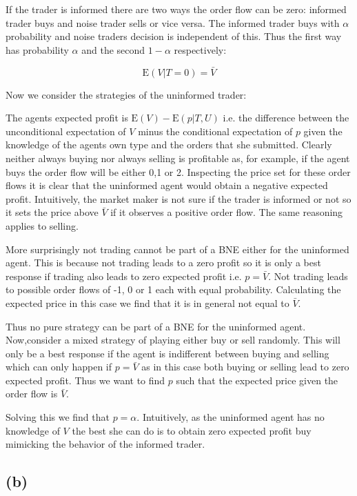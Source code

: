 \documentclass{article}
\begin{document}
If the trader is informed there are two ways the order flow can be zero: informed trader buys and noise trader sells or vice versa. The informed trader buys with $\alpha$ probability and noise traders decision is independent of this. Thus the first way has probability $\alpha$ and the second $1-\alpha$ respectively:

\begin{equation}
\mathrm{E}(V \vert T=0) = \bar{V}
\end{equation}

Now we consider the strategies of the uninformed trader:

The agents expected profit is $\mathrm{E}(V) - \mathrm{E}(p \vert T, U)$ i.e. the difference between the unconditional expectation of $V$ minus the conditional expectation of $p$ given the knowledge of the agents own type and the orders that she submitted. Clearly neither always buying nor always selling is profitable as, for example, if the agent buys the order flow will be either 0,1 or 2. Inspecting the price set for these order flows it is clear that the uninformed agent would obtain a negative expected profit. Intuitively, the market maker is not sure if the trader is informed or not so it sets the price above $\bar{V}$ if it observes a positive order flow. The same reasoning applies to selling.

More surprisingly not trading cannot be part of a BNE either for the uninformed agent. This is because not trading leads to a zero profit so it is only a best response if trading also leads to zero expected profit i.e. $p=\bar{V}$. Not trading leads to possible order flows of -1, 0 or 1 each with equal probability. Calculating the expected price in this case we find that it is in general not equal to $\bar{V}$.

Thus no pure strategy can be part of a BNE for the uninformed agent. Now,consider a mixed strategy of playing either buy or sell randomly. This will only be a best response if the agent is indifferent between buying and selling which can only happen if $p = \bar{V}$ as in this case both buying or selling lead to zero expected profit. Thus we want to find $p$ such that the expected price given the order flow is $\bar{V}$. 


Solving this we find that $p=\alpha$. Intuitively, as the uninformed agent has no knowledge of $V$ the best she can do is to obtain zero expected profit buy mimicking the behavior of the informed trader.

\subsection{(b)}
\end{document}
